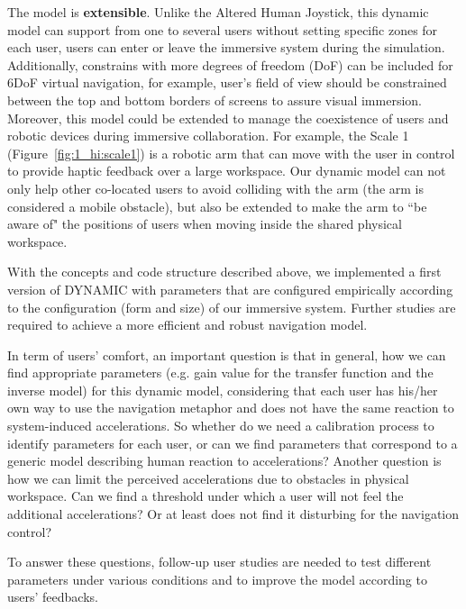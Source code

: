 The model is \textbf{extensible}. Unlike the Altered Human Joystick, this dynamic model can support from one to several users without setting specific zones for each user, users can enter or leave the immersive system during the simulation. Additionally, constrains with more degrees of freedom (DoF) can be included for 6DoF virtual navigation, for example, user's field of view should be constrained between the top and bottom borders of screens to assure visual immersion. Moreover, this model could be extended to manage the coexistence of users and robotic devices during immersive collaboration. For example, the Scale 1\texttrademark{} (Figure~\ref{fig:1_hi:scale1}) is a robotic arm that can move with the user in control to provide haptic feedback over a large workspace. Our dynamic model can not only help other co-located users to avoid colliding with the arm (the arm is considered a mobile obstacle), but also be extended to make the arm to ``be aware of" the positions of users when moving inside the shared physical workspace.

With the concepts and code structure described above, we implemented a first version of DYNAMIC with parameters that are configured empirically according to the configuration (form and size) of our immersive system. Further studies are required to achieve a more efficient and robust navigation model.

In term of users' comfort, an important question is that in general, how we can find appropriate parameters (e.g. gain value for the transfer function and the inverse model) for this dynamic model, considering that each user has his/her own way to use the navigation metaphor and does not have the same reaction to system-induced accelerations. So whether do we need a calibration process to identify parameters for each user, or can we find parameters that correspond to a generic model describing human reaction to accelerations? Another question is how we can limit the perceived accelerations due to obstacles in physical workspace. Can we find a threshold under which a user will not feel the additional accelerations? Or at least does not find it disturbing for the navigation control?

To answer these questions, follow-up user studies are needed to test different parameters under various conditions and to improve the model according to users' feedbacks.


